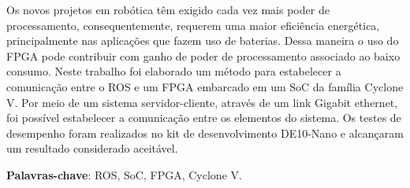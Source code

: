 
\setlength{\absparsep}{18pt} %
\begin{resumo}
    Os novos projetos em robótica têm exigido cada vez mais poder de processamento, consequentemente, requerem uma maior eficiência energética, principalmente nas aplicações que fazem uso de baterias. Dessa maneira o uso do FPGA pode contribuir com ganho de poder de processamento associado ao baixo consumo. Neste trabalho foi elaborado um método para estabelecer a comunicação entre o ROS e um FPGA embarcado em um SoC da família Cyclone V. Por meio de um sistema servidor-cliente, através de um link Gigabit ethernet, foi possível estabelecer a comunicação entre os elementos do sistema. Os testes de desempenho foram realizados no kit de desenvolvimento DE10-Nano e alcançaram um resultado considerado aceitável.

    \vspace{\onelineskip}

 \textbf{Palavras-chave}: ROS, SoC, FPGA, Cyclone V.
\end{resumo}
